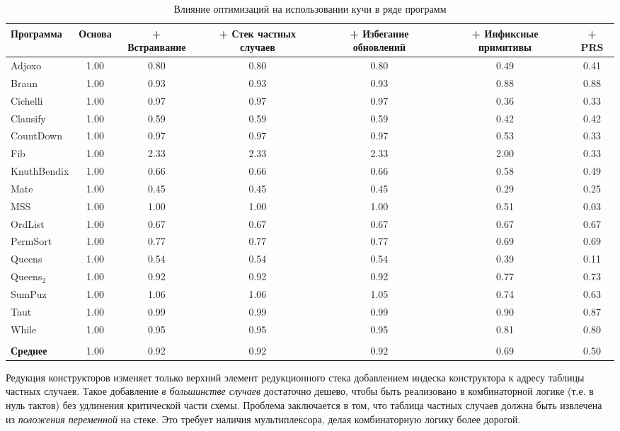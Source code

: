 \documentclass[flenqn, 14pt]{extarticle}
\begin{document}
\begin{table}[t]
\caption{Влияние оптимизаций на использовании кучи в ряде программ}
\label{tab:heap_optimisations}
\begin{tabularx}{\textwidth}{L{1.3}C{0.7}C{1}C{1}C{1}C{1}C{1}}
\hline\hline
Программа & Основа & + Встраивание & + Стек частных случаев & + Избегание обновлений & + Инфиксные примитивы & + PRS \\
\hline
Adjoxo      & 1.00 & 0.80 & 0.80 & 0.80 & 0.49 & 0.41 \\
Braun       & 1.00 & 0.93 & 0.93 & 0.93 & 0.88 & 0.88 \\
Cichelli    & 1.00 & 0.97 & 0.97 & 0.97 & 0.36 & 0.33 \\
Clausify    & 1.00 & 0.59 & 0.59 & 0.59 & 0.42 & 0.42 \\
CountDown   & 1.00 & 0.97 & 0.97 & 0.97 & 0.53 & 0.33 \\
Fib         & 1.00 & 2.33 & 2.33 & 2.33 & 2.00 & 0.33 \\
KnuthBendix & 1.00 & 0.66 & 0.66 & 0.66 & 0.58 & 0.49 \\
Mate        & 1.00 & 0.45 & 0.45 & 0.45 & 0.29 & 0.25 \\
MSS         & 1.00 & 1.00 & 1.00 & 1.00 & 0.51 & 0.03 \\
OrdList     & 1.00 & 0.67 & 0.67 & 0.67 & 0.67 & 0.67 \\
PermSort    & 1.00 & 0.77 & 0.77 & 0.77 & 0.69 & 0.69 \\
Queens      & 1.00 & 0.54 & 0.54 & 0.54 & 0.39 & 0.11 \\
Queens$_2$  & 1.00 & 0.92 & 0.92 & 0.92 & 0.77 & 0.73 \\
SumPuz      & 1.00 & 1.06 & 1.06 & 1.05 & 0.74 & 0.63 \\
Taut        & 1.00 & 0.99 & 0.99 & 0.99 & 0.90 & 0.87 \\
While       & 1.00 & 0.95 & 0.95 & 0.95 & 0.81 & 0.80 \\
            &      &      &      &      &      &      \\
\textbf{Среднее} & 1.00 & 0.92 & 0.92 & 0.92 & 0.69 & 0.50 \\       
\hline\hline
\end{tabularx}
\end{table}

Редукция конструкторов изменяет только верхний элемент редукционного стека добавлением индеска конструктора к адресу таблицы частных случаев. Такое добавление \textit{в большинстве случаев} достаточно дешево, чтобы быть реализовано в комбинаторной логике (т.е. в нуль тактов) без удлинения критической части схемы. Проблема заключается в том, что таблица частных случаев должна быть извлечена из \textit{положения переменной} на стеке. Это требует наличия мультиплексора, делая комбинаторную логику более дорогой.
\end{document}
